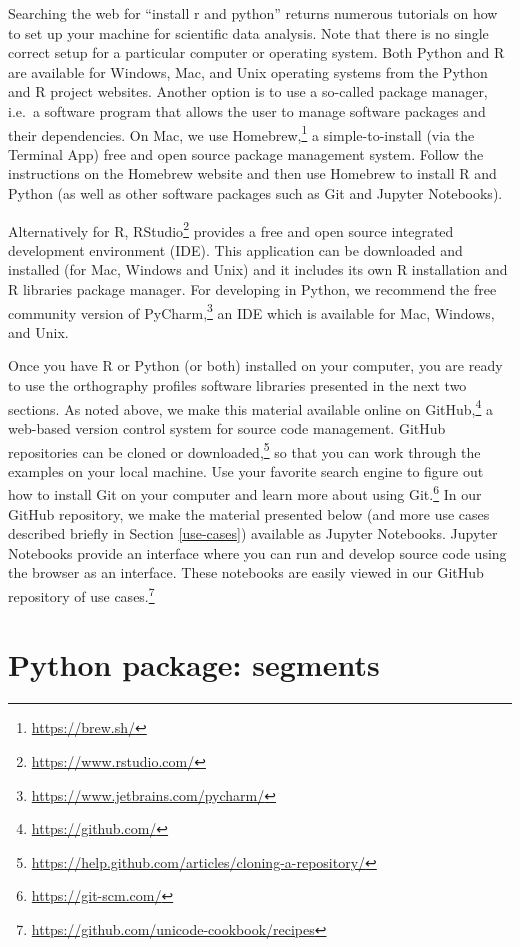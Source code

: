 \documentclass[output=book,nonflat,modfonts,
colorlinks, citecolor=brown,
		]{langsci/langscibook}\usepackage[]{graphicx}\usepackage[]{color}
\begin{document}
Searching the web for ``install r and python'' returns numerous tutorials on how to set up your machine for scientific data analysis. Note that there is no single correct setup for a particular computer or operating system. Both Python and R are available for Windows, Mac, and Unix operating systems from the Python and R project websites. Another option is to use a so-called package manager, i.e.\ a software program that allows the user to manage software packages and their dependencies. On Mac, we use Homebrew,\footnote{\url{https://brew.sh/}} a simple-to-install (via the Terminal App) free and open source package management system. Follow the instructions on the Homebrew website and then use Homebrew to install R and Python (as well as other software packages such as Git and Jupyter Notebooks). 

Alternatively for R, RStudio\footnote{\url{https://www.rstudio.com/}} provides a free and open source integrated development environment (IDE). This application can be downloaded and installed (for Mac, Windows and Unix) and it includes its own R installation and R libraries package manager. For developing in Python, we recommend the free community version of PyCharm,\footnote{\url{https://www.jetbrains.com/pycharm/}} an IDE which is available for Mac, Windows, and Unix. 

Once you have R or Python (or both) installed on your computer, you are ready to use the orthography profiles software libraries presented in the next two sections. As noted above, we make this material available online on GitHub,\footnote{\url{https://github.com/}} a web-based version control system for source code management. GitHub repositories can be cloned or downloaded,\footnote{\url{https://help.github.com/articles/cloning-a-repository/}} so that you can work through the examples on your local machine. Use your favorite search engine to figure out how to install Git on your computer and learn more about using Git.\footnote{\url{https://git-scm.com/}} In our GitHub repository, we make the material presented below (and more use cases described briefly in Section \ref{use-cases}) available as Jupyter Notebooks. Jupyter Notebooks provide an interface where you can run and develop source code using the browser as an interface. These notebooks are easily viewed in our GitHub repository of use cases.\footnote{\url{https://github.com/unicode-cookbook/recipes}}



\section{Python package: segments}
\label{python-implementations}
\end{document}
